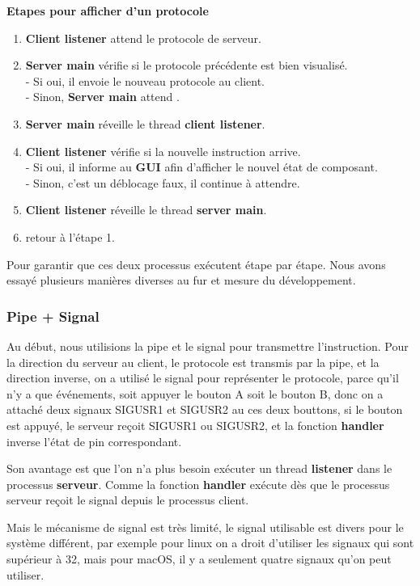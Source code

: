 \documentclass[14px]{article}
\begin{document}
	\textbf{Etapes pour afficher d'un protocole}
	\begin{enumerate}
		\item \textbf{Client listener} attend le protocole de serveur.
		\item \textbf{Server main} vérifie si le protocole précédente est bien visualisé.\\
		- Si oui, il envoie le nouveau protocole au client.\\
		- Sinon, \textbf{Server main} attend .
		\item \textbf{Server main} réveille le thread \textbf{client listener}.
		\item \textbf{Client listener} vérifie si la nouvelle instruction arrive.\\
		- Si oui, il informe au \textbf{GUI} afin d'afficher le nouvel état de composant.\\
		- Sinon, c'est un déblocage faux, il continue à attendre.
		\item \textbf{Client listener} réveille le thread \textbf{server main}.
		\item retour à l'étape 1.
	\end{enumerate}

	Pour garantir que ces deux processus exécutent étape par étape. Nous avons essayé plusieurs manières diverses au fur et mesure du développement.

	\subsubsection{Pipe + Signal}
	Au début, nous utilisions la pipe et le signal pour transmettre l'instruction. Pour la direction du serveur au client, le protocole est transmis par la pipe, et la direction inverse, on a utilisé le signal pour représenter le protocole, parce qu'il n'y a que événements, soit appuyer le bouton A soit le bouton B, donc on a attaché deux signaux SIGUSR1 et SIGUSR2 au ces deux bouttons, si le bouton est appuyé, le serveur reçoit SIGUSR1 ou SIGUSR2, et la fonction \textbf{handler} inverse l'état de pin correspondant.

	Son avantage est que l'on n'a plus besoin exécuter un thread \textbf{listener} dans le processus \textbf{serveur}. Comme la fonction \textbf{handler} exécute dès que le processus serveur reçoit le signal depuis le processus client.

	Mais le mécanisme de signal est très limité, le signal utilisable est divers pour le système différent, par exemple pour linux on a droit d'utiliser les signaux qui sont supérieur à 32, mais pour macOS, il y a seulement quatre signaux qu'on peut utiliser.
\end{document}
